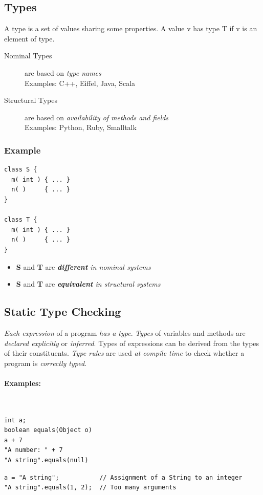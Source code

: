 \subsection{Types}
\begin{definition}[Types]
A type is a set of values sharing some properties. A value v has type T if v is an element of type. 
\end{definition}
\begin{description}
 \item[Nominal Types] are based on \emph{type names}\\
  Examples: C++, Eiffel, Java, Scala
 \item[Structural Types] are based on \emph{availability of methods and fields}\\
 Examples: Python, Ruby, Smalltalk
\end{description}
\subsubsection{Example}

\lstset{language=C}
\begin{lstlisting}
class S {
  m( int ) { ... }
  n( )     { ... }
}

class T {
  m( int ) { ... }
  n( )     { ... }
}
\end{lstlisting}
\begin{itemize}
 \item \textbf S and \textbf T are \emph{\textbf{different} in nominal systems}
 \item \textbf S and \textbf T are \emph{\textbf{equivalent} in structural systems}
\end{itemize}

\subsection{Static Type Checking}
\emph{Each expression} of a program \emph{has a type}. \emph{Types} of variables and methods are \emph{declared explicitly} or \emph{inferred}. Types of expressions can be derived from the types of their constituents. \emph{Type rules} are used \emph{at compile time} to check whether a program is \emph{correctly typed}.
\paragraph{Examples: } $\text{}$
\begin{lstlisting}[caption=compiles]
int a;
boolean equals(Object o)
a + 7
"A number: " + 7
"A string".equals(null)
\end{lstlisting}
\begin{lstlisting}[caption=results in compile-time errors]
a = "A string";           // Assignment of a String to an integer
"A string".equals(1, 2);  // Too many arguments
\end{lstlisting}

